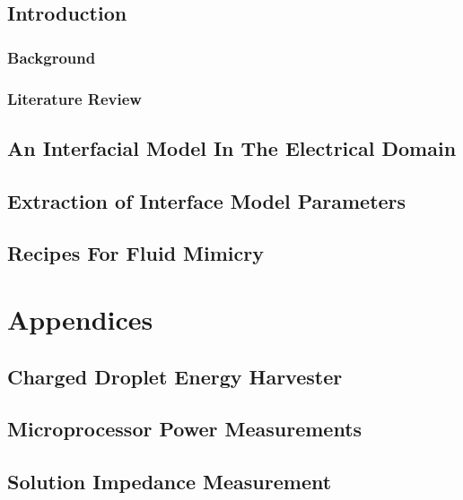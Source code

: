   \chapter{Introduction}
    \section{Background}
    \section{Literature Review}

  \chapter{An Interfacial Model In The Electrical Domain}
    

  \chapter{Extraction of Interface Model Parameters}
    

  \chapter{Recipes For Fluid Mimicry}
  \label{chap:fluid_mimicry}
    

\part{Appendices}
  \appendix
  \chapter{Charged Droplet Energy Harvester}
    \label{appendix:chargedDropletts}
    
  \chapter{Microprocessor Power Measurements}
    
  \chapter{Solution Impedance Measurement}
    
